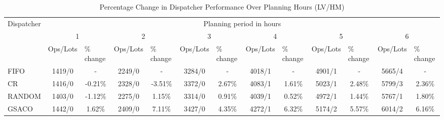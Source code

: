 \begin{table}[]
	\caption{Percentage Change in Dispatcher Performance Over Planning Hours (LV/HM)}\label{tab:dispatchers-LVHM}
	\begin{tabular}{|l|cccccccccccc|}
		\hline
		\multirow{3}{*}{Dispatcher} &
		\multicolumn{12}{c|}{Planning period in hours} \\ \cline{2-13} 
		&
		\multicolumn{2}{c|}{1} &
		\multicolumn{2}{c|}{2} &
		\multicolumn{2}{c|}{3} &
		\multicolumn{2}{c|}{4} &
		\multicolumn{2}{c|}{5} &
		\multicolumn{2}{c|}{6} \\ \cline{2-13} 
		&
		\multicolumn{1}{l|}{Ops/Lots} &
		\multicolumn{1}{l|}{\% change} &
		\multicolumn{1}{l|}{Ops/Lots} &
		\multicolumn{1}{l|}{\% change} &
		\multicolumn{1}{l|}{Ops/Lots} &
		\multicolumn{1}{l|}{\% change} &
		\multicolumn{1}{l|}{Ops/Lots} &
		\multicolumn{1}{l|}{\% change} &
		\multicolumn{1}{l|}{Ops/Lots} &
		\multicolumn{1}{l|}{\% change} &
		\multicolumn{1}{l|}{Ops/Lots} &
		\multicolumn{1}{l|}{\% change} \\ \hline
		FIFO &
		\multicolumn{1}{c|}{1419/0} &
		\multicolumn{1}{c|}{-} &
		\multicolumn{1}{c|}{2249/0} &
		\multicolumn{1}{c|}{-} &
		\multicolumn{1}{c|}{3284/0} &
		\multicolumn{1}{c|}{-} &
		\multicolumn{1}{c|}{4018/1} &
		\multicolumn{1}{c|}{-} &
		\multicolumn{1}{c|}{4901/1} &
		\multicolumn{1}{c|}{-} &
		\multicolumn{1}{c|}{5665/4} &
		- \\
		CR &
		\multicolumn{1}{c|}{1416/0} &
		\multicolumn{1}{c|}{-0.21\%} &
		\multicolumn{1}{c|}{2328/0} &
		\multicolumn{1}{c|}{-3.51\%} &
		\multicolumn{1}{c|}{3372/0} &
		\multicolumn{1}{c|}{2.67\%} &
		\multicolumn{1}{c|}{4083/1} &
		\multicolumn{1}{c|}{1.61\%} &
		\multicolumn{1}{c|}{5023/1} &
		\multicolumn{1}{c|}{2.48\%} &
		\multicolumn{1}{c|}{5799/3} &
		2.36\% \\
		RANDOM &
		\multicolumn{1}{c|}{1403/0} &
		\multicolumn{1}{c|}{-1.12\%} &
		\multicolumn{1}{c|}{2275/0} &
		\multicolumn{1}{c|}{1.15\%} &
		\multicolumn{1}{c|}{3314/0} &
		\multicolumn{1}{c|}{0.91\%} &
		\multicolumn{1}{c|}{4039/1} &
		\multicolumn{1}{c|}{0.52\%} &
		\multicolumn{1}{c|}{4972/1} &
		\multicolumn{1}{c|}{1.44\%} &
		\multicolumn{1}{c|}{5767/1} &
		1.80\% \\
		GSACO &
		\multicolumn{1}{c|}{1442/0} &
		\multicolumn{1}{c|}{1.62\%} &
		\multicolumn{1}{c|}{2409/0} &
		\multicolumn{1}{c|}{7.11\%} &
		\multicolumn{1}{c|}{3427/0} &
		\multicolumn{1}{c|}{4.35\%} &
		\multicolumn{1}{c|}{4272/1} &
		\multicolumn{1}{c|}{6.32\%} &
		\multicolumn{1}{c|}{5174/2} &
		\multicolumn{1}{c|}{5.57\%} &
		\multicolumn{1}{c|}{6014/2} &
		6.16\% \\ \hline
	\end{tabular}%
\end{table}

